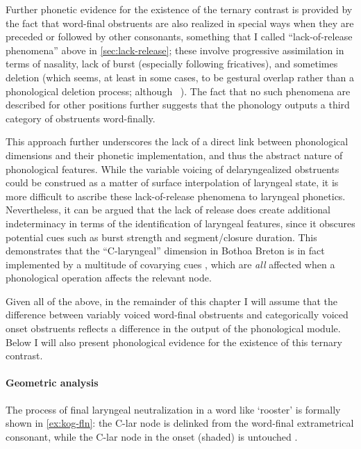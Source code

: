 Further phonetic evidence for the existence of the ternary contrast is provided by the fact that word-final obstruents are also realized in special ways when they are preceded or followed by other consonants, something that I called \enquote{lack\hyp of\hyp release phenomena} above in \cref{sec:lack-release}; these involve progressive assimilation in terms of nasality, lack of burst (especially following fricatives), and sometimes deletion (which seems, at least in some cases, to be gestural overlap rather than a phonological deletion process; although \cf\ \citealt{bermudez-otero10:_curren_englis}). The fact that no such phenomena are described for other positions further suggests that the phonology outputs a third category of obstruents word-finally.

This approach further underscores the lack of a direct link between phonological dimensions and their phonetic implementation, and thus the abstract nature of phonological features. While the variable voicing of delaryngealized obstruents could be construed as a matter of surface interpolation of laryngeal state, it is more  difficult to ascribe these lack\hyp of\hyp release phenomena to laryngeal phonetics. Nevertheless, it can be argued that the lack of release does create additional indeterminacy in terms of the identification of laryngeal features, since it obscures potential cues such as burst strength and segment\fshyp closure duration. This demonstrates that the \enquote{C-laryngeal} dimension in Bothoa Breton is in fact implemented by a multitude of covarying cues \citep{phon-knowledge,kingston08}, which are \emph{all} affected when a phonological operation affects the relevant node.

Given all of the above, in the remainder of this chapter I will assume that the difference between variably voiced word-final obstruents and categorically voiced onset obstruents reflects a difference in the output of the phonological module. Below I will also present phonological evidence for the existence of this ternary contrast.

\paragraph{Geometric analysis}
\label{sec:geometric-analysis}

The process of final laryngeal neutralization in a word like  `rooster' is formally shown in \ref{ex:kog-fln}: the C-lar node is delinked from the word-final extrametrical consonant, while the C-lar node in the onset (shaded) is untouched \citep[\cfm][]{hall09:_laryn_breton}.

